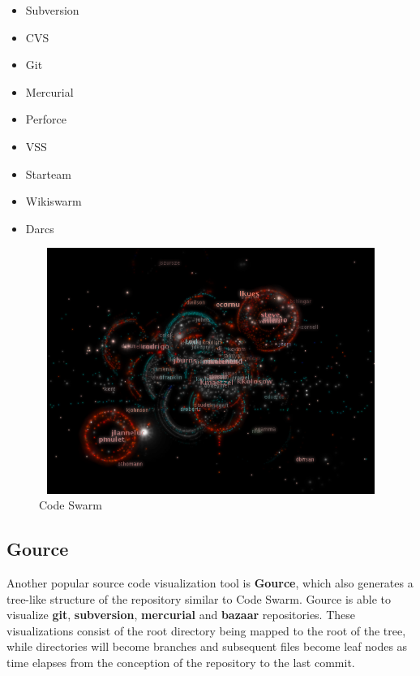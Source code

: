 \documentclass{article}
\begin{document}
\begin {itemize}
	\item {Subversion}
	\item {CVS}
	\item {Git}
	\item {Mercurial}
	\item {Perforce}
	\item {VSS}
	\item {Starteam}
	\item {Wikiswarm}
	\item {Darcs}
\end {itemize}

\begin{figure}[h!]
\centering
\includegraphics[height=8cm, width=12cm]{swarm}
\caption{Code Swarm}
\end{figure}

\subsection {Gource}

Another popular source code visualization tool is \textbf{Gource}, which also generates a tree-like structure of the repository similar to Code Swarm. Gource is able to visualize \textbf{git}, \textbf{subversion}, \textbf{mercurial} and \textbf{bazaar} repositories. These visualizations consist of the root directory being mapped to the root of the tree, while directories will become branches and subsequent files become leaf nodes as time elapses from the conception of the repository to the last commit. 
\end{document}
